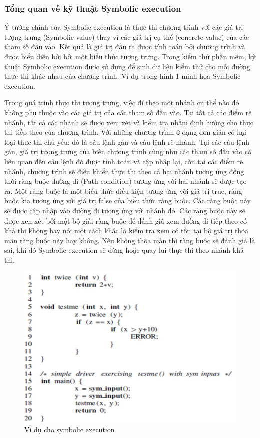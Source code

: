 \documentclass[12pt,a4paper]{article}
\begin{document}
\subsubsection{Tổng quan về kỹ thuật Symbolic execution}
Ý tưởng chính của Symbolic execution là thực thi chương trình với các giá trị tượng trưng (Symbolic value) thay vì các giá trị cụ thể (concrete value) của các tham số đầu vào. Kết quả là giá trị đầu ra được tính toán bởi chương trình và được biểu diễn bởi bởi một biểu thức tượng trưng. Trong kiểm thử phần mềm, kỹ thuật Symbolic execution được sử dụng để sinh dữ liệu kiểm thử cho mỗi đường thực thi khác nhau của chương trình. Ví dụ trong hình 1 minh họa Symbolic execution.

\indent Trong quá trình thực thi tượng trưng, việc đi theo một nhánh cụ thể nào đó không phụ thuộc vào các giá trị của các tham số đầu vào. Tại tất cả các điểm rẽ nhánh, tất cả các nhánh sẽ được xem xét và kiểm tra nhằm định hướng cho thực thi tiếp theo của chương trình. Với những chương trình ở dạng đơn giản có hại loại thực thi chủ yếu: đó là câu lệnh gán và câu lệnh rẽ nhánh. Tại các câu lệnh gán, giá trị tượng trưng của biến chương trình cũng như các tham số đầu vào có liên quan đến câu lệnh đó được tính toán và cập nhập lại, còn tại các điểm rẽ nhánh, chương trình sẽ điều khiển thực thi theo cả hai nhánh tương ứng đồng thời ràng buộc đường đi (Path condition) tương ứng với hai nhánh sẽ được tạo ra. Một ràng buộc là một biểu thức điều kiện tương ứng với giá trị true, ràng buộc kia tương ứng với giá trị false của biểu thức ràng buộc. Các ràng buộc này sẽ được cập nhập vào đường đi tương ứng với nhánh đó. Các ràng buộc này sẽ được xen xét bởi một bộ giải ràng buộc để đánh giá xem đường đi tiếp theo có khả thi không hay nói một cách khác là kiểm tra xem có tồn tại bộ giá trị thõa mãn ràng buộc này hay không. Nếu không thõa màn thì ràng buộc sẽ đánh giá là sai, khi đó Symbolic execution sẽ dừng hoặc quay lui thực thi theo nhánh khả thi.

\begin{figure}[ht]
\begin{center}
\includegraphics{hinhanh/hinh1}
\end{center}
\caption{Ví dụ cho symbolic execution}
\end{figure}
\end{document}
